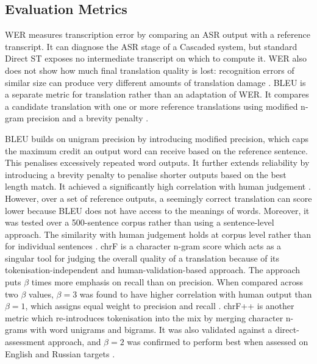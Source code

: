 \subsection{Evaluation Metrics}

WER measures transcription error by comparing an ASR output with a reference
transcript. It can diagnose the ASR stage of a Cascaded system, but standard
Direct ST exposes no intermediate transcript on which to compute it. WER also
does not show how much final translation quality is lost: recognition errors
of similar size can produce very different amounts of translation damage
\cite{le2017disentangling}. BLEU is a separate metric for translation rather
than an adaptation of WER. It compares a candidate translation with one or
more reference translations using modified n-gram precision and a brevity
penalty \cite{papineni2002bleu}.

BLEU builds on unigram precision by introducing modified precision, which caps
the maximum credit an output word can receive based on the reference sentence.
This penalises excessively repeated word outputs. It further extends
reliability by introducing a brevity penalty to penalise shorter outputs based
on the best length match. It achieved a significantly high correlation with
human judgement \cite{papineni2002bleu}. However, over a set of reference
outputs, a seemingly correct translation can score lower because BLEU does not
have access to the meanings of words. Moreover, it was tested over a
500-sentence corpus rather than using a sentence-level approach. The similarity
with human judgement holds at corpus level rather than for individual sentences
\cite{papineni2002bleu}. chrF is a character n-gram score which acts as a
singular tool for judging the overall quality of a translation because of its
tokenisation-independent and human-validation-based approach. The approach
puts $\beta$ times more emphasis on recall than on precision. When compared
across two $\beta$ values, $\beta = 3$ was found to have higher correlation
with human output than $\beta = 1$, which assigns equal weight to precision and
recall \cite{popovic2015chrf}. chrF++ is another metric which re-introduces
tokenisation into the mix by merging character n-grams with word unigrams and
bigrams. It was also validated against a direct-assessment approach, and
$\beta = 2$ was confirmed to perform best when assessed on English and Russian
targets \cite{popovic2017chrfpp}.

